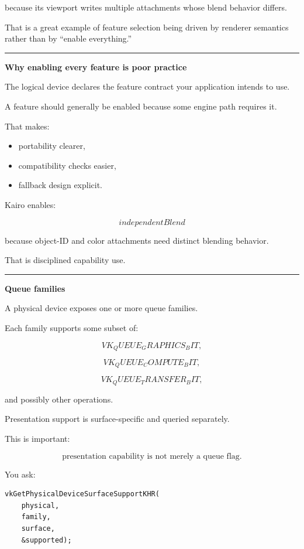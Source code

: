 because its viewport writes multiple attachments whose blend behavior differs.

That is a great example of feature selection being driven by renderer semantics rather than by ``enable everything.''

\begin{center}\rule{0.5\linewidth}{0.5pt}\end{center}

\textbf{Why enabling every feature is poor practice}

The logical device declares the feature contract your application intends to use.

A feature should generally be enabled because some engine path requires it.

That makes:

\begin{itemize}
\tightlist
\item
  portability clearer,
\item
  compatibility checks easier,
\item
  fallback design explicit.
\end{itemize}

Kairo enables:

\[
\boxed{
independentBlend
}
\]

because object-ID and color attachments need distinct blending behavior.

That is disciplined capability use.

\begin{center}\rule{0.5\linewidth}{0.5pt}\end{center}

\textbf{Queue families}

A physical device exposes one or more queue families.

Each family supports some subset of:

\[
VK_QUEUE_GRAPHICS_BIT,
\]

\[
VK_QUEUE_COMPUTE_BIT,
\]

\[
VK_QUEUE_TRANSFER_BIT,
\]

and possibly other operations.

Presentation support is surface-specific and queried separately.

This is important:

\[
\boxed{
\text{presentation capability is not merely a queue flag}.
}
\]

You ask:

\begin{verbatim}
vkGetPhysicalDeviceSurfaceSupportKHR(
    physical,
    family,
    surface,
    &supported);
\end{verbatim}

